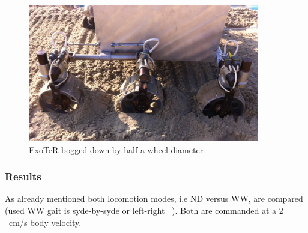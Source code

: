 \documentclass[a4paper,twocolumn]{esapub2005} %
\begin{document}
\begin{figure}[h!]
    \centering
    \includegraphics[width=0.9\textwidth]{volleyexoterdigg.jpg}
    \caption{ExoTeR bogged down by half a wheel diameter}
    \label{fig:volleyexoterdigg}
\end{figure}

\subsubsection{Results} As already mentioned both locomotion modes, i.e ND
versus WW, are compared (used WW gait is syde-by-syde or left-right
~\cite{LucWalkingGaits}). Both are commanded at a 2 ~\unit{cm/s} body velocity.
\end{document}
